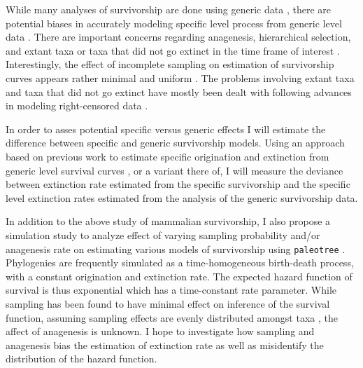 \documentclass[12pt,letterpaper]{article}
\begin{document}


While many analyses of survivorship are done using generic data \citep{Tomiya2013,Liow2008,Harnik2013}, there are potential biases in accurately modeling specific level process from generic level data \citep{Raup1975,Sepkoski1975,Simpson2006,Raup1991a,VanValen1979}. There are important concerns regarding anagenesis, hierarchical selection, and extant taxa or taxa that did not go extinct in the time frame of interest \citep{Raup1975,VanValen1979,Simpson2006,Raup1991a}. Interestingly, the effect of incomplete sampling on estimation of survivorship curves appears rather minimal and uniform \citep{Sepkoski1975}. The problems involving extant taxa and taxa that did not go extinct have mostly been dealt with following advances in modeling right-censored data \citep{Kleinbaum2005}.

In order to asses potential specific versus generic effects I will estimate the difference between specific and generic survivorship models. Using an approach based on previous work to estimate specific origination and extinction from generic level survival curves \citep{Foote1988}, or a variant there of, I will measure the deviance between extinction rate estimated from the specific survivorship and the specific level extinction rates estimated from the analysis of the generic survivorship data. 

In addition to the above study of mammalian survivorship, I also propose a simulation study to analyze effect of varying sampling probability and/or anagenesis rate on estimating various models of survivorship using \texttt{paleotree} \citep{Bapst2012a}. Phylogenies are frequently simulated as a time-homogeneous birth-death process, with a constant origination and extinction rate. The expected hazard function of survival is thus exponential which has a time-constant rate parameter. While sampling has been found to have minimal effect on inference of the survival function, assuming sampling effects are evenly distributed amongst taxa \citep{Sepkoski1975}, the affect of anagenesis is unknown. I hope to investigate how sampling and anagenesis bias the estimation of extinction rate as well as misidentify the distribution of the hazard function.
\end{document}
